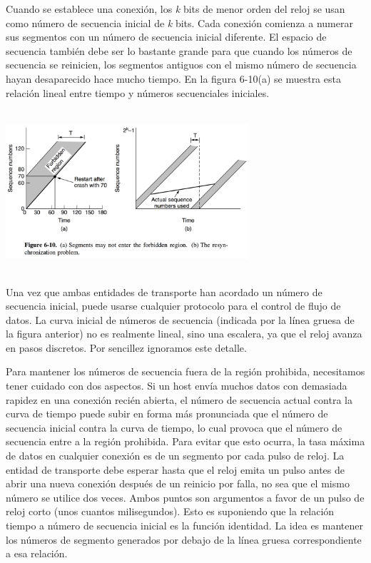 \documentclass[10pt,a4paper]{report}
\begin{document}
		\par Cuando se establece una conexión, los \textit{k} bits de menor orden del reloj se usan como número de secuencia inicial de \textit{k} bits. Cada conexión comienza a numerar sus segmentos con un número de secuencia inicial diferente. El espacio de secuencia también debe ser lo bastante grande para que cuando los números de secuencia se reinicien, los segmentos antiguos con el mismo número de secuencia hayan desaparecido hace mucho tiempo. En la figura 6-10(a) se muestra esta relación lineal entre tiempo y números secuenciales iniciales.

		\begin{center} 
			\includegraphics[width=9cm, height=6cm]{./imagenes/tomlinson.png} 
		\end{center}

		\par Una vez que ambas entidades de transporte han acordado un número de secuencia inicial, puede usarse cualquier protocolo para el control de flujo de datos. La curva inicial de números de secuencia (indicada por la línea gruesa de la figura anterior) no es realmente lineal, sino una escalera, ya que el reloj avanza en pasos discretos. Por sencillez ignoramos este detalle.

		\par Para mantener los números de secuencia fuera de la región prohibida, necesitamos tener cuidado con dos aspectos. Si un host envía muchos datos con demasiada rapidez en una conexión recién abierta, el número de secuencia actual contra la curva de tiempo puede subir en forma más pronunciada que el número de secuencia inicial contra la curva de tiempo, lo cual provoca que el número de secuencia entre a la región prohibida. Para evitar que esto ocurra, la tasa máxima de datos en cualquier conexión es de un segmento por cada pulso de reloj. La entidad de transporte debe esperar hasta que el reloj emita un pulso antes de abrir una nueva conexión después de un reinicio por falla, no sea que el mismo número se utilice dos veces.
Ambos puntos son argumentos a favor de un pulso de reloj corto (unos cuantos milisegundos). Esto es suponiendo que la relación tiempo a número de secuencia inicial es la función identidad. La idea es mantener los números de segmento generados por debajo de la línea gruesa correspondiente a esa relación.
\end{document}
